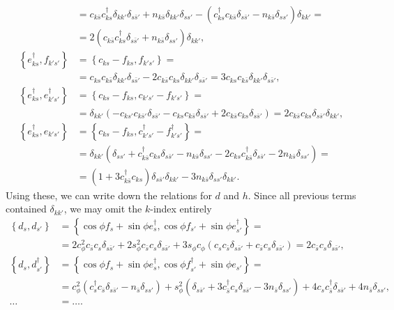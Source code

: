 \documentclass[english, parskip=full]{scrartcl}
\newcommand{\kla}{}
\newcommand{\klammer}{}
\begin{document}
\begin{align}
&= c_{k\bar{s}} c_{ks}^\dagger \delta_{kk'} \delta_{s\bar{s}'} + n_{k\bar{s}} \delta_{kk'} \delta_{ss'} - \left( c_{ks}^\dagger c_{k\bar{s}} \delta_{s\bar{s}'} - n_{k\bar{s}} \delta_{ss'} \right) \delta_{kk'} = \\
&= 2\kla\left( c_{k\bar{s}} c_{ks}^\dagger \delta_{s\bar{s}'} + n_{k\bar{s}} \delta_{ss'} \right) \delta_{kk'},\\
\klammer\left\{ e_{ks}^\dagger, f_{k's'} \right\} &= \klammer\left\{ c_{ks} - f_{ks}, f_{k's'} \right\} = \\
&= c_{ks}c_{k\bar{s}} \delta_{kk'} \delta_{s\bar{s}'} - 2c_{k\bar{s}} c_{ks} \delta_{kk'} \delta_{s\bar{s}'} = 3c_{ks} c_{k\bar{s}}  \delta_{kk'} \delta_{s\bar{s}'},\\
\klammer\left\{ e_{ks}^\dagger, e_{k's'}^\dagger \right\} &= \klammer\left\{ c_{ks} - f_{ks}, c_{k's'} - f_{k's'} \right\} = \\
&= \delta_{kk'} \kla\left( -c_{ks'}c_{k\bar{s}'} \delta_{s\bar{s}'} - c_{ks}c_{k\bar{s}} \delta_{s\bar{s}'} + 2c_{k\bar{s}} c_{ks} \delta_{s\bar{s}'} \right) = 2c_{k\bar{s}} c_{ks} \delta_{s\bar{s}'} \delta_{kk'} ,\\
\klammer\left\{ e_{ks}^\dagger, e_{k's'} \right\} &= \klammer\left\{ c_{ks} - f_{ks}, c_{k's'}^\dagger - f_{k's'}^\dagger \right\} = \\
&= \delta_{kk'} \kla\left( \delta_{ss'} + c_{k\bar{s}}^\dagger c_{ks} \delta_{s\bar{s}'} - n_{k\bar{s}} \delta_{ss'} - 2c_{ks} c_{k\bar{s}}^\dagger \delta_{s\bar{s}'} - 2n_{k\bar{s}} \delta_{ss'} \right) = \\
&= \kla\left( 1 + 3c_{k\bar{s}}^\dagger c_{ks} \right) \delta_{s\bar{s}'} \delta_{kk'} - 3n_{k\bar{s}} \delta_{ss'} \delta_{kk'}.
\end{align}
Using these, we can write down the relations for $d$ and $h$.
Since all previous terms contained $\delta_{kk'}$, we may omit the $k$-index entirely
\begin{align}
\klammer\left\{ d_{s}, d_{s'} \right\} &= \klammer\left\{ \cos \phi f_{s} + \sin\phi e_{s}^\dagger, \cos \phi f_{s'} + \sin\phi e_{s'}^\dagger \right\} = \\
&= 2c_\phi^2 c_{\bar{s}} c_s \delta_{s\bar{s}'}  + 2s_\phi^2 c_{\bar{s}} c_s \delta_{s\bar{s}'} + 3s_\phi c_\phi \kla\left( c_sc_{\bar{s}} \delta_{s\bar{s}'} + c_{\bar{s}} c_s \delta_{s\bar{s}'} \right) = 2c_{\bar{s}}c_s \delta_{s\bar{s}'},\\
\klammer\left\{ d_s, d_{s'}^\dagger \right\} &= \left\{ \cos \phi f_{s} + \sin\phi e_{s}^\dagger, \cos \phi f_{s'}^\dagger + \sin\phi e_{s'} \right\} = \\
&= c_\phi^2 \kla\left( c_s^\dagger c_{\bar{s}} \delta_{s\bar{s}'} - n_{\bar{s}} \delta_{ss'} \right) + s_\phi^2 \left( \delta_{s\bar{s}'} + 3c_{\bar{s}}^\dagger c_{s} \delta_{s\bar{s}'} - 3n_{\bar{s}} \delta_{ss'} \right) + 4c_{s}c_{\bar{s}}^\dagger \delta_{s\bar{s}'} + 4n_{\bar{s}} \delta_{ss'},\\
\dots &= \dots.
\end{align}




\end{document}
